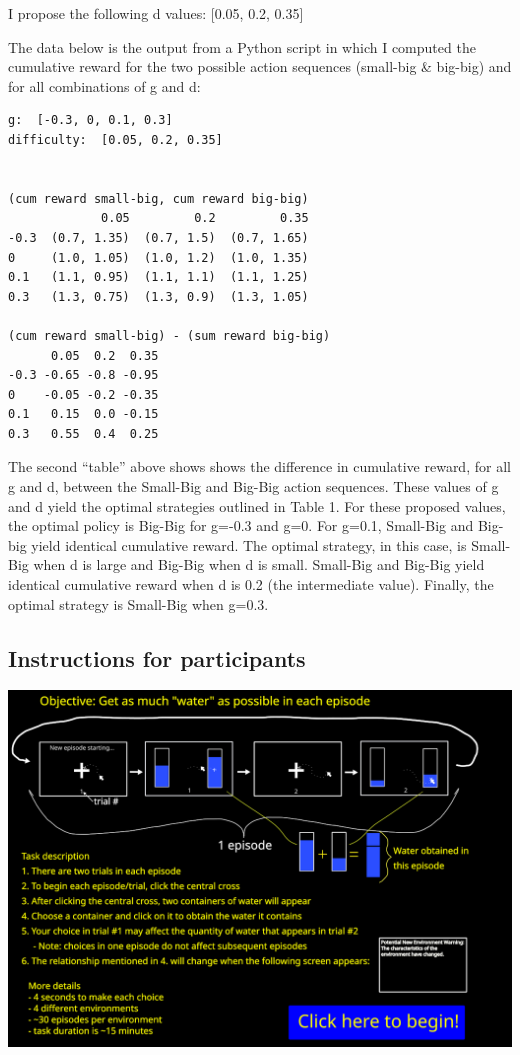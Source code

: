 \documentclass[11pt]{article}
\begin{document}
I propose the following d values: [0.05, 0.2, 0.35]

The data below is the output from a Python script in which I computed the cumulative reward for the two possible action sequences (small-big \& big-big) and for all combinations of g and d:

\label{}
\begin{verbatim}
g:  [-0.3, 0, 0.1, 0.3]
difficulty:  [0.05, 0.2, 0.35]


(cum reward small-big, cum reward big-big)
             0.05         0.2         0.35
-0.3  (0.7, 1.35)  (0.7, 1.5)  (0.7, 1.65)
0     (1.0, 1.05)  (1.0, 1.2)  (1.0, 1.35)
0.1   (1.1, 0.95)  (1.1, 1.1)  (1.1, 1.25)
0.3   (1.3, 0.75)  (1.3, 0.9)  (1.3, 1.05) 

(cum reward small-big) - (sum reward big-big)
      0.05  0.2  0.35
-0.3 -0.65 -0.8 -0.95
0    -0.05 -0.2 -0.35
0.1   0.15  0.0 -0.15
0.3   0.55  0.4  0.25
\end{verbatim}

The second ``table'' above shows shows the difference in cumulative reward, for all g and d, between the Small-Big and Big-Big action sequences. These values of g and d yield the optimal strategies outlined in Table 1. For these proposed values, the optimal policy is Big-Big for g=-0.3 and g=0. For g=0.1, Small-Big and Big-big yield identical cumulative reward.  The optimal strategy, in this case, is Small-Big when d is large and Big-Big when d is small. Small-Big and Big-Big yield identical cumulative reward when d is 0.2 (the intermediate value). Finally, the optimal strategy is Small-Big when g=0.3.
\subsection{Instructions for participants}
\label{sec:org31aae5e}
\begin{center}
\includegraphics[width=.9\linewidth]{./img/instructions.png}
\end{center}
\end{document}
